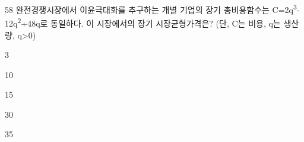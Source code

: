 \begin{question}{58}
완전경쟁시장에서 이윤극대화를 추구하는 개별 기업의 장기 총비용함수는 C=2q\textsuperscript{3}-12q\textsuperscript{2}+48q로 동일하다. 이 시장에서의 장기 시장균형가격은? (단, C는 비용, q는 생산량, q>0)
\begin{choices}
  \item 3
  \item 10
  \item 15
  \item 30
  \item 35
\end{choices}
\end{question}
